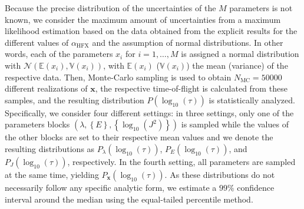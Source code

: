 \documentclass[%
 reprint,
superscriptaddress,
 amsmath,amssymb,
 aps,
prb,
floatfix
]{revtex4-2}
\newcommand{\ahfx}{\ensuremath{\alpha_\text{HFX}}\xspace}
\begin{document}
Because the precise distribution of the uncertainties of the $M$ parameters is not known, we consider the maximum amount of uncertainties from a maximum likelihood estimation based on the data obtained from the explicit results for the different values of \ahfx and the assumption of normal distributions. In other words, each of the parameters $x_i$ for $i=1,\ldots,M$ is assigned a normal distribution with $\mathcal{N}(\mathbb{E}(x_i),\mathbb{V}(x_i))$, with $\mathbb{E}(x_i)$ ($\mathbb{V}(x_i)$) the mean (variance) of the respective data. Then, Monte-Carlo sampling is used to obtain $N_\text{MC}=50000$ different realizations of $\mathbf{x}$, the respective time-of-flight is calculated from these samples, and the resulting distribution $P(\log_{10}(\tau))$ is statistically analyzed. Specifically, we consider four different settings: in three settings, only one of the parameters blocks $(\lambda,\left\{E\right\},\left\{\log_{10}(J^2)\right\})$ is sampled while the values of the other blocks are set to their respective mean values and we denote the resulting distributions as $P_\lambda(\log_{10}(\tau))$, $P_E(\log_{10}(\tau))$, and $P_J(\log_{10}(\tau))$, respectively. In the fourth setting, all parameters are sampled at the same time, yielding $P_\mathbf{x}(\log_{10}(\tau))$. As these distributions do not necessarily follow any specific analytic form, we estimate a $99\%$ confidence interval around the median using the equal-tailed percentile method.


\end{document}
